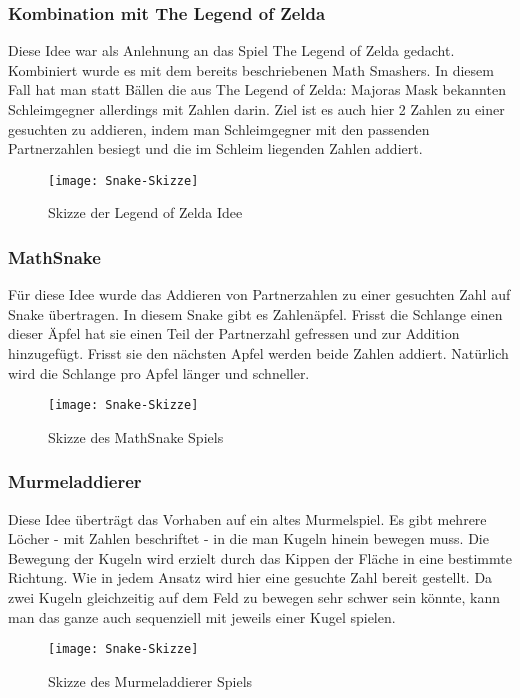 \subsubsection{Kombination mit The Legend of Zelda} %
Diese Idee war als Anlehnung an das Spiel The Legend of Zelda gedacht. Kombiniert wurde es mit dem bereits beschriebenen Math Smashers. In diesem Fall hat man statt Bällen die aus The Legend of Zelda: Majoras Mask bekannten Schleimgegner allerdings mit Zahlen darin. Ziel ist es auch hier 2 Zahlen zu einer gesuchten zu addieren, indem man Schleimgegner mit den passenden Partnerzahlen besiegt und die im Schleim liegenden Zahlen addiert.
\begin{figure}[htb]
	\centering
	\texttt{[image: Snake-Skizze]}
	\caption{Skizze der Legend of Zelda Idee\label{fig:zelda}}
\end{figure}
\subsubsection{MathSnake}
Für diese Idee wurde das Addieren von Partnerzahlen zu einer gesuchten Zahl auf Snake übertragen. In diesem Snake gibt es Zahlenäpfel. Frisst die Schlange einen dieser Äpfel hat sie einen Teil der Partnerzahl gefressen und zur Addition hinzugefügt. Frisst sie den nächsten Apfel werden beide Zahlen addiert. Natürlich wird die Schlange pro Apfel länger und schneller.
\begin{figure}[htb]
	\centering
	\texttt{[image: Snake-Skizze]}
	\caption{Skizze des MathSnake Spiels\label{fig:mathsnake}}
\end{figure}
\subsubsection{Murmeladdierer}
Diese Idee überträgt das Vorhaben auf ein altes Murmelspiel. Es gibt mehrere Löcher - mit Zahlen beschriftet - in die man Kugeln hinein bewegen muss. Die Bewegung der Kugeln wird erzielt durch das Kippen der Fläche in eine bestimmte Richtung. Wie in jedem Ansatz wird hier eine gesuchte Zahl bereit gestellt. Da zwei Kugeln gleichzeitig auf dem Feld zu bewegen sehr schwer sein könnte, kann man das ganze auch sequenziell mit jeweils einer Kugel spielen.
\begin{figure}[htb]
	\centering
	\texttt{[image: Snake-Skizze]}
	\caption{Skizze des Murmeladdierer Spiels\label{fig:murmadd}}
\end{figure}

